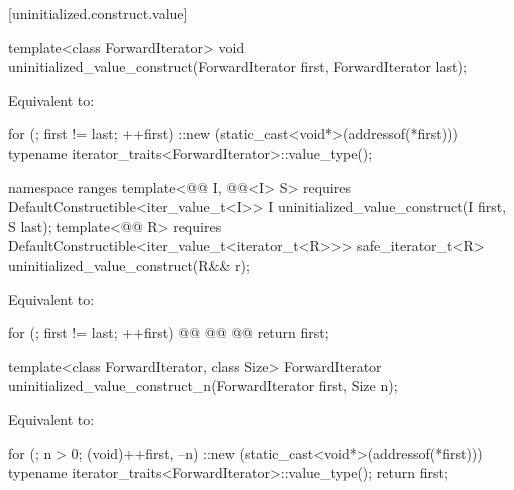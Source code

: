 [uninitialized.construct.value]{}

%
\begin{itemdecl}
template<class ForwardIterator>
  void uninitialized_value_construct(ForwardIterator first, ForwardIterator last);
\end{itemdecl}

\begin{itemdescr}
\pnum
\effects
Equivalent to:
\begin{codeblock}
for (; first != last; ++first)
  ::new (static_cast<void*>(addressof(*first)))
    typename iterator_traits<ForwardIterator>::value_type();
\end{codeblock}
\end{itemdescr}

\begin{addedblock}
%
\begin{itemdecl}
namespace ranges {
  template<@@ I, @@<I> S>
      requires DefaultConstructible<iter_value_t<I>>
    I uninitialized_value_construct(I first, S last);
  template<@@ R>
      requires DefaultConstructible<iter_value_t<iterator_t<R>>>
    safe_iterator_t<R> uninitialized_value_construct(R&& r);
}
\end{itemdecl}

\begin{itemdescr}
\pnum
\effects Equivalent to:
\begin{codeblock}
for (; first != last; ++first)
  @@
    @@
  @@
return first;
\end{codeblock}
\end{itemdescr}
\end{addedblock}

%
\begin{itemdecl}
template<class ForwardIterator, class Size>
  ForwardIterator uninitialized_value_construct_n(ForwardIterator first, Size n);
\end{itemdecl}

\begin{itemdescr}
\pnum
\effects
Equivalent to:
\begin{codeblock}
for (; n > 0; (void)++first, --n)
  ::new (static_cast<void*>(addressof(*first)))
    typename iterator_traits<ForwardIterator>::value_type();
return first;
\end{codeblock}
\end{itemdescr}


